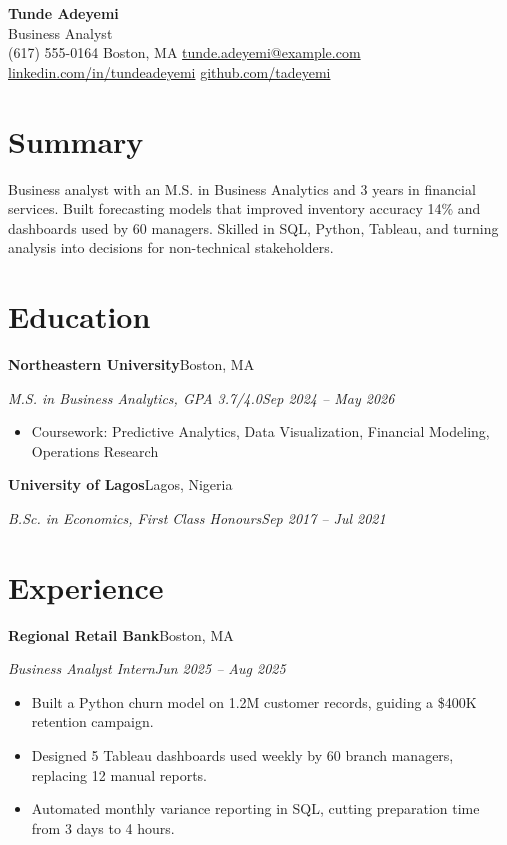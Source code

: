 \documentclass[letterpaper,11pt]{article}
\makeatletter
\newcommand{\csep}{\hspace{5pt}\textbar\hspace{5pt}}
\newcommand{\rRole}[4]{%
  \vspace{4pt}%
  \noindent\textbf{#2}\hfill#3\par
  \noindent\textit{#1}\hfill\textit{#4}\par
  \vspace{1pt}%
}
\newcommand{\rEdu}[4]{%
  \vspace{4pt}%
  \noindent\textbf{#2}\hfill#3\par
  \noindent\textit{#1}\hfill\textit{#4}\par
  \vspace{1pt}%
}
\newenvironment{rBullets}
  {\begin{itemize}[leftmargin=15pt,itemsep=1.5pt,parsep=0pt,topsep=3pt,
                   partopsep=0pt,label=\textbullet]}
  {\end{itemize}}
\def\name{Tunde Adeyemi}
\def\role{Business Analyst}
\def\phone{(617) 555-0164}
\def\location{Boston, MA}
\def\email{tunde.adeyemi@example.com}
\def\LinkedIn{tundeadeyemi}
\def\github{tadeyemi}
\makeatother
\begin{document}
\begin{center}
  {\LARGE\bfseries\name}\\[4pt]
  {\large\role}\\[5pt]
  {\small
    \phone\csep
    \location\csep
    \href{mailto:\email}{\email}\csep
    \href{https://linkedin.com/in/\LinkedIn}{linkedin.com/in/\LinkedIn}\csep
    \href{https://github.com/\github}{github.com/\github}}
\end{center}

\section{Summary}
Business analyst with an M.S. in Business Analytics and 3 years in financial
services. Built forecasting models that improved inventory accuracy 14\% and
dashboards used by 60 managers. Skilled in SQL, Python, Tableau, and turning
analysis into decisions for non-technical stakeholders.

\section{Education}
\rEdu{M.S. in Business Analytics, GPA 3.7/4.0}{Northeastern University}{Boston, MA}{Sep 2024 -- May 2026}
\begin{rBullets}
  \item Coursework: Predictive Analytics, Data Visualization, Financial Modeling, Operations Research
\end{rBullets}
\rEdu{B.Sc. in Economics, First Class Honours}{University of Lagos}{Lagos, Nigeria}{Sep 2017 -- Jul 2021}

\section{Experience}

\rRole{Business Analyst Intern}{Regional Retail Bank}{Boston, MA}{Jun 2025 -- Aug 2025}
\begin{rBullets}
  \item Built a Python churn model on 1.2M customer records, guiding a \$400K retention campaign.
  \item Designed 5 Tableau dashboards used weekly by 60 branch managers, replacing 12 manual reports.
  \item Automated monthly variance reporting in SQL, cutting preparation time from 3 days to 4 hours.
\end{rBullets}
\end{document}
